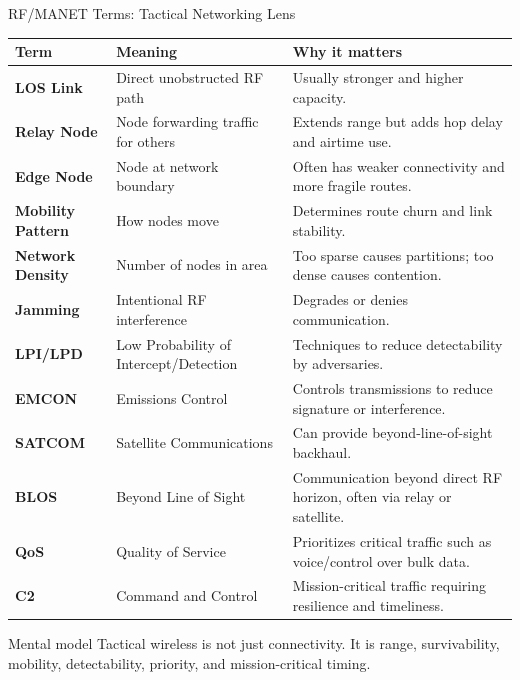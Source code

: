 \documentclass[aspectratio=169]{beamer}
\begin{document}
\begin{frame}{RF/MANET Terms: Tactical Networking Lens}
\tiny
\begin{tabular}{p{2.0cm} p{3.4cm} p{6.7cm}}
\toprule
\textbf{Term} & \textbf{Meaning} & \textbf{Why it matters} \\
\midrule
\textbf{LOS Link} & Direct unobstructed RF path & Usually stronger and higher capacity. \\
\textbf{Relay Node} & Node forwarding traffic for others & Extends range but adds hop delay and airtime use. \\
\textbf{Edge Node} & Node at network boundary & Often has weaker connectivity and more fragile routes. \\
\textbf{Mobility Pattern} & How nodes move & Determines route churn and link stability. \\
\textbf{Network Density} & Number of nodes in area & Too sparse causes partitions; too dense causes contention. \\
\textbf{Jamming} & Intentional RF interference & Degrades or denies communication. \\
\textbf{LPI/LPD} & Low Probability of Intercept/Detection & Techniques to reduce detectability by adversaries. \\
\textbf{EMCON} & Emissions Control & Controls transmissions to reduce signature or interference. \\
\textbf{SATCOM} & Satellite Communications & Can provide beyond-line-of-sight backhaul. \\
\textbf{BLOS} & Beyond Line of Sight & Communication beyond direct RF horizon, often via relay or satellite. \\
\textbf{QoS} & Quality of Service & Prioritizes critical traffic such as voice/control over bulk data. \\
\textbf{C2} & Command and Control & Mission-critical traffic requiring resilience and timeliness. \\
\bottomrule
\end{tabular}

\vspace{0.15cm}
\begin{block}{Mental model}
Tactical wireless is not just connectivity. It is range, survivability, mobility, detectability, priority, and mission-critical timing.
\end{block}
\end{frame}
\end{document}
